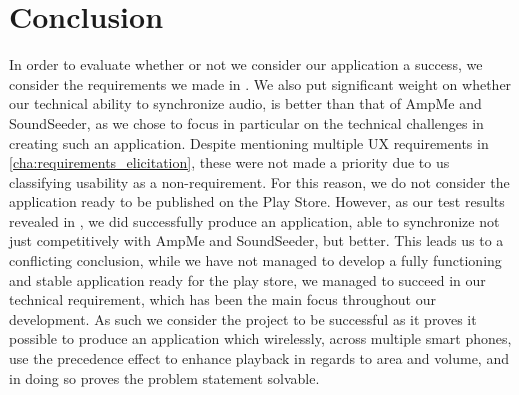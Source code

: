 
\section{Conclusion}
In order to evaluate whether or not we consider our application a success, we consider the requirements we made in .
We also put significant weight on whether our technical ability to synchronize audio, is better than that of AmpMe and SoundSeeder, as we chose to focus in particular on the technical challenges in creating such an application.
Despite mentioning multiple \ac{UX} requirements in \cref{cha:requirements_elicitation}, these were not made a priority due to us classifying usability as a non-requirement.
For this reason, we do not consider the application ready to be published on the Play Store.
However, as our test results revealed in , we did successfully produce an application, able to synchronize not just competitively with AmpMe and SoundSeeder, but better.
This leads us to a conflicting conclusion, while we have not managed to develop a fully functioning and stable application ready for the play store, we managed to succeed in our technical requirement, which has been the main focus throughout our development.
As such we consider the project to be successful as it proves it possible to produce an application which wirelessly, across multiple smart phones, use the precedence effect to enhance playback in regards to area and volume, and in doing so proves the problem statement solvable.
